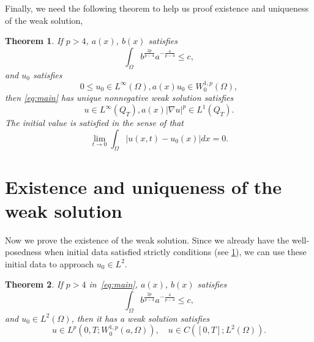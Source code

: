 \documentclass[11pt]{amsart}
\newtheorem{theorem}{Theorem}[section]
\theoremstyle{definition}
\numberwithin{equation}{section}
\newcommand*\abs[1]{\lvert#1\rvert}
\begin{document}
Finally, we need the following theorem to help us proof existence and uniqueness of the weak solution,
\begin{theorem}\cite[thm 1.3 and 1.6]{Zhan2019Uniquenessa}\label{thm:zhan}
	If $p>4$, $a(x)$, $b(x)$ satisfies
	\begin{equation}
		\int_{\Omega} b^{\frac{2p}{p-4}}a^{-\frac{4}{p-4}} \leq c,
	\end{equation}
	and $u_0$ satisfies
	\begin{equation}
		0 \leq u_0 \in L^{\infty}(\Omega), a(x)u_0 \in W_0^{1,p}(\Omega),
	\end{equation}
	then \cref{eq:main} has unique nonnegative weak solution satisfies
	\begin{equation}
		u \in L^{\infty}(Q_T), a(x)\abs{\nabla u}^p \in L^1(Q_T).
	\end{equation}
	The initial value is satisfied in the sense of that
	\begin{equation}
		\lim_{t \to 0}\int_{\Omega}\abs{u(x,t) - u_0(x)}dx = 0.
	\end{equation}
\end{theorem}

\section{Existence and uniqueness of the weak solution}\label{sec:Existence_and_uniqueness_of_the_weak_solution}
Now we prove the existence of the weak solution.
Since we already have the well-posedness when initial data
satisfied strictly conditions (see \cref{thm:zhan}),
we can use these
initial data to approach $u_0 \in L^2$.
\begin{theorem}\label{thm:absorb}
If $p>4$ in~\cref{eq:main}, $a(x)$, $b(x)$ satisfies
\begin{equation}
	\int_{\Omega} b^{\frac{2p}{p-4}}a^{-\frac{4}{p-4}} \leq c,
\end{equation}
and $u_0 \in L^2(\Omega) $, then it has a weak solution satisfies
\begin{equation}
u \in L^p(0, T; W_0^{1,p}(a,\Omega)), \quad u \in C([0, T]; L^2(\Omega)).
\end{equation}
\end{theorem}
\end{document}
